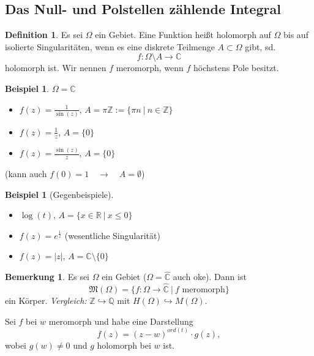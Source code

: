 \documentclass[11pt,titlepage]{article}
\theoremstyle{definition}
\newtheorem{definition}[theorem]{Definition}
\newtheorem{example}[theorem]{Beispiel}
\newtheorem{remark}{Bemerkung}
\theoremstyle{remark}
\begin{document}
	\subsection{Das Null- und Polstellen zählende Integral}
	
	\begin{definition}
		Es sei $\Omega$ ein Gebiet. Eine Funktion heißt holomorph auf $\Omega$ bis auf isolierte 
		Singularitäten, wenn es eine diskrete Teilmenge $A\subset\Omega$ gibt, sd.
		\[ f:\Omega\setminus A\to\mathbb{C}\]
		holomorph ist. Wir nennen $f$ meromorph, wenn $f$ höchstens Pole besitzt.
	\end{definition}
	
	\begin{example}
		$\Omega =\mathbb{C}$
		\begin{itemize}
			\item $f(z)=\frac{1}{\sin(z)}$, $A=\pi\mathbb{Z}:=\{\pi n\ \vert\ n\in\mathbb{Z}\}$
			
			\item $f(z)=\frac{1}{z}$, $A=\{0\}$
			
			\item $f(z)=\frac{\sin(z)}{z}$, $A=\{0\}$
		\end{itemize}
		(kann auch $f(0)=1\quad\to\quad A=\emptyset$)
	\end{example}
	
	\begin{example}[Gegenbeispiele]
		\begin{itemize}
			\item $\log(t)$, $A=\{ x\in\mathbb{R}\ \vert\ x\leq 0\}$
			
			\item $f(z)=e^{\frac{1}{z}}$ (wesentliche Singularität)
			
			\item $f(z)=|z|$, $A=\mathbb{C}\setminus\{0\}$
		\end{itemize}
	\end{example}
	
	\begin{remark}
		Es sei $\Omega$ ein Gebiet ($\Omega =\hat{\mathbb{C}}$ auch oke). Dann ist 
		\[ \mathfrak{M}(\Omega)=\{f:\Omega\to\hat{\mathbb{C}}\ \vert\  f\text{ meromorph}\} \]
		ein Körper. \textsl{Vergleich:} $\mathbb{Z}\hookrightarrow \mathbb{Q}$ mit $H(\Omega)
		\hookrightarrow M(\Omega)$.
	\end{remark}
	
	Sei $f$ bei $w$ meromorph und habe eine Darstellung 
	\[ f(z)=(z-w)^{ord(t)}\cdot g(z),\]
	wobei $g(w)\neq 0$ und $g$ holomorph bei $w$ ist.
	
\end{document}
